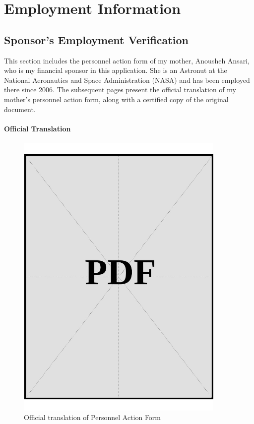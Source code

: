 \chapter{Employment Information}
\label{sec:employment-information}


\section{Sponsor's Employment Verification}

\noindent
This section includes the personnel action form of my mother, Anousheh Ansari, who is my financial sponsor in this application. She is an Astronut at the National Aeronautics and Space Administration (NASA) and has been employed there since 2006. The subsequent pages present the official translation of my mother's personnel action form, along with a certified copy of the original document.


\clearpage

\subsubsection*{Official Translation}
\vspace*{\fill}
\begin{figure}[H]
    \centering
    \includegraphics[page=1, width=0.9\textwidth]{../application-docs/sponsor/employment/employment-letter-official-translation.pdf}
    \caption{Official translation of Personnel Action Form}
    \label{fig:paf-official-trans}
\end{figure}
\vspace*{\fill}

